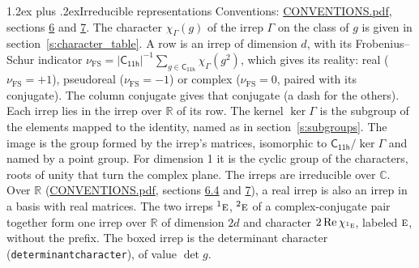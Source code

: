 \documentclass[10pt,a4paper]{article}
\makeatletter
\renewcommand\section{\@startsection{section}{1}{\z@}{-3ex plus -1ex minus -.2ex}%
  {1.2ex plus .2ex}{\normalfont\large\sffamily\bfseries\color{parttitle}}}
\numberwithin{equation}{section}
\newcommand{\grp}[1]{\mathsf{#1}}
\newcommand{\irr}[1]{\text{\normalfont\scshape #1}}
\newcommand{\conjpair}[1]{{}^{#1}}
\newcommand{\irchar}[1]{\chi_{#1}}
\newcommand{\fsind}{\nu_{\mathrm{FS}}}
\makeatother
\begin{document}
\section{Irreducible representations}\label{s:irreps}
Conventions: \href{../../CONVENTIONS.pdf}{CONVENTIONS.pdf}, sections \href{../../CONVENTIONS.pdf\#conv.6}{6} and \href{../../CONVENTIONS.pdf\#conv.7}{7}.
\leavevmode\label{n:function.character}\label{n:irrep.Gamma}The character $\irchar{\Gamma}(g)$ of the irrep $\Gamma$ on the class of $g$ is given in section~\ref{s:character_table}.
\leavevmode\label{n:index.dimension}\label{n:index.frobenius}\label{n:head.irrep}\label{n:head.reality}A row is an irrep of dimension $d$, with its Frobenius--Schur indicator $\fsind = |\grp{C_{11h}}|^{-1}\allowbreak\sum_{g\in\grp{C_{11h}}}\irchar{\Gamma}(g^2)$, which gives its reality: real ($\fsind = +1$), pseudoreal ($\fsind = -1$) or complex ($\fsind = 0$, paired with its conjugate). \label{n:head.conjugate}The column conjugate gives that conjugate (a dash for the others). \label{n:head.over.real}Each irrep lies in the irrep over $\mathbb{R}$ of its row. \label{n:head.kernel}The kernel $\ker\Gamma$ is the subgroup of the elements mapped to the identity, named as in section~\ref{s:subgroups}. \label{n:head.image}The image is the group formed by the irrep's matrices, isomorphic to $\grp{C_{11h}}/\ker\Gamma$ and named by a point group. For dimension 1 it is the cyclic group of the characters, roots of unity that turn the complex plane. The irreps are irreducible over $\mathbb{C}$. Over $\mathbb{R}$ (\href{../../CONVENTIONS.pdf}{CONVENTIONS.pdf}, sections \href{../../CONVENTIONS.pdf\#conv.6.4}{6.4} and \href{../../CONVENTIONS.pdf\#conv.7}{7}), a real irrep is also an irrep in a basis with real matrices. The two irreps $\conjpair{1}\irr{e}$, $\conjpair{2}\irr{e}$ of a complex-conjugate pair together form one irrep over $\mathbb{R}$ of dimension $2d$ and character $2\operatorname{Re}\irchar{\conjpair{1}\irr{e}}$, labeled $\irr{e}$, without the prefix. \label{n:mark.determinant}The boxed irrep is the determinant character (\texttt{determinantcharacter}), of value $\det g$.
\setlength{\emergencystretch}{2em}\par\setlength{\emergencystretch}{0pt}
\end{document}
